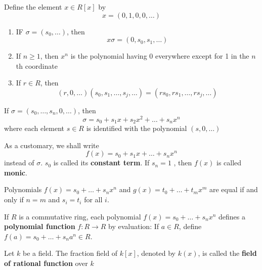\documentclass[11pt]{article}
\begin{document}
\begin{definition}[]
Define the element \(x\in R[x]\) by
\begin{equation*}
x=(0,1,0,0,\dots)
\end{equation*}
\end{definition}

\begin{lemma}[]
\begin{enumerate}
\item IF \(\sigma=(s_0,\dots)\), then
\begin{equation*}
x\sigma=(0,s_0,s_1,\dots)
\end{equation*}
\item If \(n\ge 1\), then \(x^n\) is the polynomial having 0 everywhere except for 1
in the \(n\)th coordinate
\item If \(r\in R\), then
\begin{equation*}
(r,0,\dots)(s_0,s_1,\dots,s_j,\dots)=(rs_0,rs_1,\dots,rs_j,\dots)
\end{equation*}
\end{enumerate}
\end{lemma}

\begin{proposition}[]
If \(\sigma=(s_0,\dots,s_n,0,\dots)\), then
\begin{equation*}
\sigma=s_0+s_1x+s_2x^2+\dots+s_nx^n
\end{equation*}
where each element \(s\in R\) is identified with the polynomial \((s,0,\dots)\)
\end{proposition}

As a customary, we shall write 
\begin{equation*}
f(x)=s_0+s_1x+\dots+s_nx^n
\end{equation*}
instead of \(\sigma\). \(s_0\) is called its \textbf{constant term}. If \(s_n=1\) , then
\(f(x)\) is called \textbf{monic}.

\begin{corollary}[]
Polynomials \(f(x)=s_0+\dots+s_nx^n\) and \(g(x)=t_0+\dots+t_mx^m\) are equal if
and only if \(n=m\) and \(s_i=t_i\) for all \(i\).
\end{corollary}

If \(R\) is a commutative ring, each polynomial \(f(x)=s_0+\dots+s_nx^n\)
defines a \textbf{polynomial function} \(f:R\to R\) by evaluation: If \(a\in R\), define
\(f(a)=s_0+\dots+s_na^n\in R\).


\begin{definition}[]
Let \(k\) be a field. The fraction field of \(k[x]\), denoted by \(k(x)\), is
called the \textbf{field of rational function} over \(k\)
\end{definition}
\end{document}
